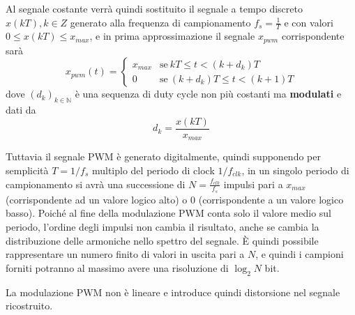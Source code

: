 Al segnale costante verrà quindi sostituito il segnale a tempo discreto $x(kT), k \in Z$ generato alla frequenza di campionamento $f_s = \frac{1}{T}$ e con valori $0 \leq x(kT) \leq x_{max}$, e in prima approssimazione il segnale $x_{pwm}$ corrispondente sarà
\[
x_{pwm}(t) = \begin{cases}
	x_{max} & \text{se}\ kT \le t < (k + d_k)T \\
	0 & \text{se}\ (k+d_k)T \le t < (k+1)T
\end{cases}
\]
dove $(d_k)_{k \in \mathbb{N}}$ è una sequenza di duty cycle non più costanti ma \textbf{modulati} e dati da
\[
d_k = \frac{x(kT)}{x_{max}}
\]

Tuttavia il segnale PWM è generato digitalmente, quindi supponendo per semplicità $T=1/f_s$ multiplo del periodo di clock $1/f_{clk}$, in un singolo periodo
di campionamento si avrà una successione di $N=\frac{f_{clk}}{f_s}$ impulsi pari a $x_{max}$ (corrispondente ad un valore logico alto) o $0$ (corrispondente a un valore logico basso).
Poiché al fine della modulazione PWM conta solo il valore medio sul periodo, l'ordine degli impulsi non cambia il risultato, anche se cambia la distribuzione delle armoniche nello spettro del segnale.
È quindi possibile rappresentare un numero finito di valori in uscita pari a $N$, e quindi i campioni forniti potranno al massimo avere una risoluzione di $\log_2{N}$ bit.

La modulazione PWM non è lineare e introduce quindi distorsione nel segnale ricostruito.
